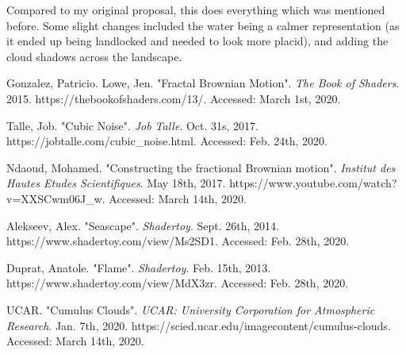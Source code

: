 \documentclass[12pt,letterpaper]{article}
\begin{document}
Compared to my original proposal, this does everything which was mentioned before. Some slight changes included the water being a calmer representation (as it ended up being landlocked and needed to look more placid), and adding the cloud shadows across the landscape.


\begin{thebibliography}{9}

Gonzalez, Patricio. Lowe, Jen. "Fractal Brownian Motion". \textit{The Book of Shaders}. 2015. https://thebookofshaders.com/13/. Accessed: March 1st, 2020.

Talle, Job. "Cubic Noise". \textit{Job Talle}. Oct. 31s, 2017. https://jobtalle.com/cubic\_noise.html. Accessed: Feb. 24th, 2020.

Ndaoud, Mohamed. "Constructing the fractional Brownian motion". \textit{Institut des Hautes Etudes Scientifiques}. May 18th, 2017. https://www.youtube.com/watch?v=XXSCwm06J\_w. Accessed: March 14th, 2020.

Alekseev, Alex. "Seascape". \textit{Shadertoy}. Sept. 26th, 2014.  https://www.shadertoy.com/view/Ms2SD1. Accessed: Feb. 28th, 2020.

Duprat, Anatole. "Flame". \textit{Shadertoy}. Feb. 15th, 2013. https://www.shadertoy.com/view/MdX3zr. Accessed: Feb. 28th, 2020.

UCAR. "Cumulus Clouds". \textit{UCAR: University Corporation for Atmospheric Research}. Jan. 7th, 2020. https://scied.ucar.edu/imagecontent/cumulus-clouds. Accessed: March 14th, 2020.

\end{thebibliography}
\end{document}
